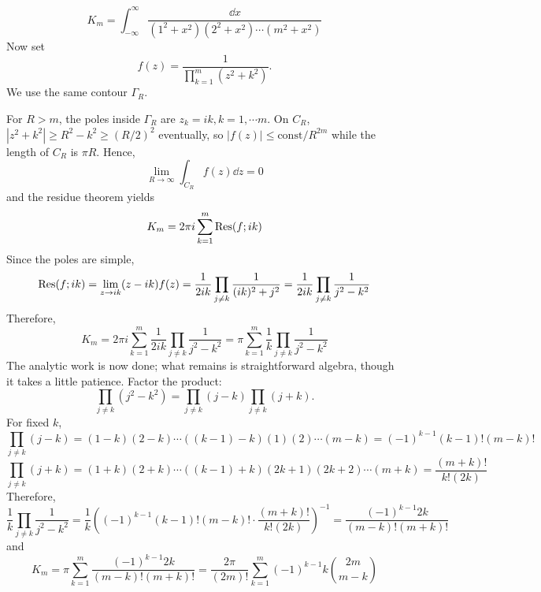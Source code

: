 \partsep
\begin{equation*}
    K_{m} = \int_{-\infty}^{\infty} \frac{\dd x}{(1^{2} + x^{2})(2^{2} + x^{2}) \cdots (m^{2} + x^{2})}
\end{equation*}
Now set
\begin{equation*}
    f(z) = \frac{1}{\prod_{k = 1}^{m}(z^{2} + k^{2})}.
\end{equation*}
We use the same contour $\Gamma_{R}$.

For $R > m$, the poles inside $\Gamma_{R}$ are $z_{k} = ik, k = 1, \cdots m$. On $C_{R}$, $|z^{2} + k^{2}| \geq R^{2} - k^{2} \geq (R/2)^{2}$ eventually,
so $|f(z)| \leq \text{const}/R^{2m}$ while the length of $C_{R}$ is $\pi R$. Hence,
\begin{equation*}
    \lim_{R \to \infty} \int_{C_{R}}f(z)\dd z = 0
\end{equation*}
and the residue theorem yields
\begin{equation*}
    K_{m} = 2\pi i \sum_{k = 1}^{m} \operatorname{Res}(f; ik)
\end{equation*}
Since the poles are simple,
\begin{equation*}
    \operatorname{Res}(f; ik) = \lim_{z \to ik}(z - ik)f(z) = \frac{1}{2ik} \prod_{j \neq k} \frac{1}{(ik)^{2} + j^{2}}
        = \frac{1}{2ik} \prod_{j \neq k} \frac{1}{j^{2} - k^{2}}
\end{equation*}
Therefore,
\begin{equation*}
    K_{m} = 2\pi i \sum_{k = 1}^{m} \frac{1}{2ik} \prod_{j \neq k} \frac{1}{j^{2} - k^{2}}
        = \pi \sum_{k = 1}^{m} \frac{1}{k} \prod_{j \neq k} \frac{1}{j^{2} - k^{2}}
\end{equation*}
The analytic work is now done; what remains is straightforward algebra, though it takes a little patience.
Factor the product:
\begin{equation*}
    \prod_{j \neq k}(j^{2} - k^{2}) = \prod_{j \neq k}(j - k)\prod_{j \neq k}(j + k).
\end{equation*}
For fixed $k$,
\begin{equation*}
    \prod_{j \neq k}(j - k) = (1 - k)(2 - k) \cdots ((k - 1) - k)(1)(2) \cdots (m - k) = (-1)^{k - 1}(k - 1)!(m - k)!
\end{equation*}
\begin{equation*}
    \prod_{j \neq k}(j + k) = (1 + k)(2 + k) \cdots ((k - 1) + k)(2k + 1)(2k + 2) \cdots (m + k) = \frac{(m + k)!}{k!(2k)}
\end{equation*}
Therefore,
\begin{equation*}
    \frac{1}{k} \prod_{j \neq k} \frac{1}{j^{2} - k^{2}} = \frac{1}{k} \left((-1)^{k - 1}(k - 1)!(m - k)! \cdot \frac{(m + k)!}{k!(2k)} \right)^{-1}
        = \frac{(-1)^{k - 1}2k}{(m - k)!(m + k)!}
\end{equation*}
and
\begin{equation*}
    K_{m} = \pi \sum_{k = 1}^{m} \frac{(-1)^{k - 1}2k}{(m - k)!(m + k)!} = \frac{2\pi}{(2m)!} \sum_{k = 1}^{m}(-1)^{k - 1}k \binom{2m}{m - k}
\end{equation*}

